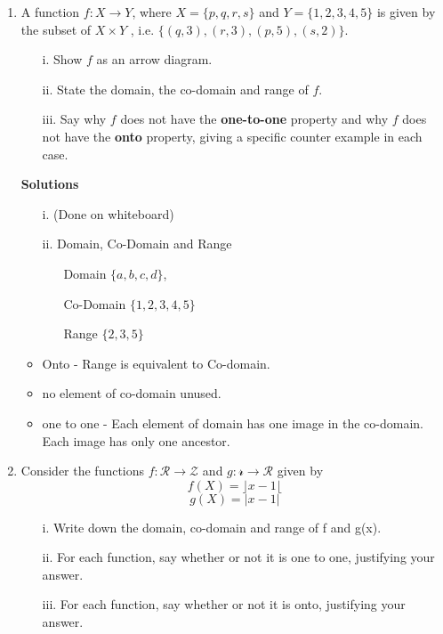 \documentclass[]{article}
\begin{document}
\begin{enumerate}
\item A function $f : X \rightarrow Y$, where $X = \{p,q,r,s\}$ and $Y=\{1,2,3,4,5\}$ is given by the subset of $ X \times Y$ ,
i.e. $\{(q,3),(r,3),(p,5),(s,2)\}$.

\begin{itemize}
\item[i.] Show $f$ as an arrow diagram.
\item[ii.] State the domain, the co-domain and range of $f$.
\item[iii.] Say why $f$ does not have the \textbf{one-to-one} property and why $f$ does not have the \textbf{onto} property, giving a specific counter example in each case.
\end{itemize}
\begin{framed}
\textbf{Solutions}
\begin{itemize}
\item[i.] (Done on whiteboard)
\item[ii.] Domain, Co-Domain and Range
\begin{itemize}
\item[Domain] $\{a,b,c,d\}$,
\item[Co-Domain] $\{1,2,3,4,5\}$
\item[Range] $\{2,3,5\}$
\end{itemize}
\end{itemize}

\begin{itemize}
\item Onto - Range is equivalent to Co-domain.
\item no element of co-domain unused.
\item one to one - Each element of domain has one image in the co-domain. Each image has only one ancestor.
\end{itemize}
\end{framed}

\item Consider the functions $f: \mathcal{R} \rightarrow \mathcal{Z}$ and $g: \mathcal{r} \rightarrow \mathcal{R}$ given by
\[f(X) = \rfloor x-1 \lfloor \]
\[g(X) = | x-1 | \]

\begin{itemize}
\item[i.] Write down the domain, co-domain and range of f and g(x). 
\item[ii.] For each function, say whether or not it is one to one, justifying your
answer. 
\item[iii.] For each function, say whether or not it is onto, justifying your answer.
\end{itemize}


\end{enumerate}
\end{document}

